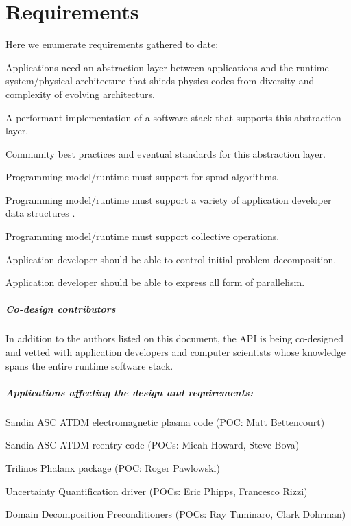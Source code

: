 
\chapter{Requirements} 
\label{chap:requirements} 
Here we enumerate requirements gathered to date: 
\begin{compactitem}
\item Applications need an abstraction layer between applications and the
runtime system/physical architecture that shieds physics codes from diversity and
complexity of evolving architecturs.
\item A performant implementation of a software stack that supports this
abstraction layer.
\item Community best practices and eventual standards for this abstraction
layer.
\item Programming model/runtime must support for \gls{spmd} algorithms.
\item Programming model/runtime must support a variety of application developer data structures .
\item Programming model/runtime must support collective operations.
\item Application developer should be able to control initial problem decomposition.
\item Application developer should be able to express all form of parallelism.
\end{compactitem}


\paragraph{Co-design contributors}
In addition to the authors listed on this document,
the \gls{API} is being \gls{co-design}ed and vetted with application developers
and computer scientists whose knowledge spans the entire runtime software stack.

\paragraph{Applications affecting the design and requirements:}
\begin{compactitem}
\item Sandia \gls{ASC} \gls{ATDM} electromagnetic plasma code (POC: Matt Bettencourt)
\item Sandia \gls{ASC} \gls{ATDM} reentry code (POCs: Micah Howard, Steve Bova)
\item \gls{Trilinos} Phalanx package (POC: Roger Pawlowski)
\item Uncertainty Quantification driver (POCs: Eric Phipps, Francesco Rizzi)
\item Domain Decomposition Preconditioners (POCs: Ray Tuminaro, Clark Dohrman)
\end{compactitem}
 
